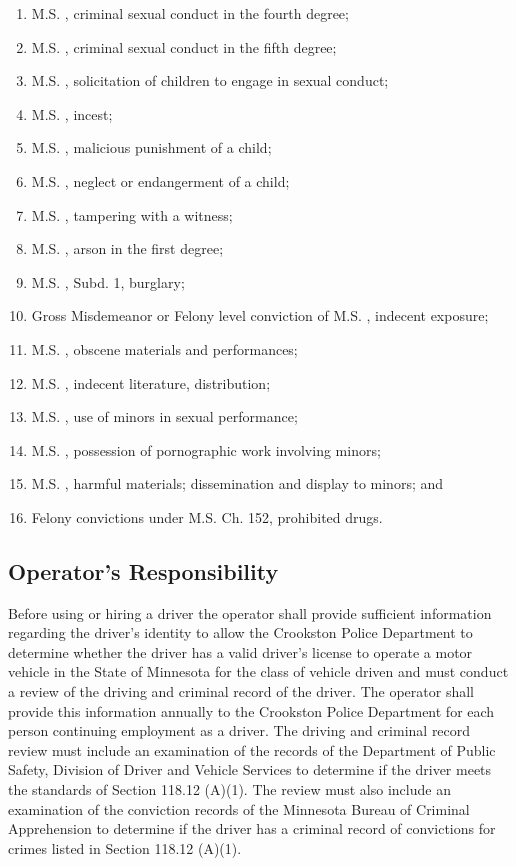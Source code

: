 \begin{enumerate}[{\indent}1)]
    \item M.S. , criminal sexual conduct in the fourth degree;
    \item M.S. , criminal sexual conduct in the fifth degree;
    \item M.S. , solicitation of children to engage in sexual conduct;
    \item M.S. , incest;
    \item M.S. , malicious punishment of a child;
    \item M.S. , neglect or endangerment of a child;
    \item M.S. , tampering with a witness;
    \item M.S. , arson in the first degree;
    \item M.S. , Subd. 1, burglary;
    \item Gross Misdemeanor or Felony level conviction of M.S. , indecent exposure;
    \item M.S. , obscene materials and performances;
    \item M.S. , indecent literature, distribution;
    \item M.S. , use of minors in sexual performance;
    \item M.S. , possession of pornographic work involving minors;
    \item M.S. , harmful materials; dissemination and display to minors; and
    \item Felony convictions under M.S. Ch. 152, prohibited drugs.
\end{enumerate}
\subsection{Operator’s Responsibility}
Before using or hiring a driver the operator shall provide sufficient information regarding the driver’s identity to allow the Crookston Police Department to determine whether the driver has a valid driver’s license to operate a motor vehicle in the State of Minnesota for the class of vehicle driven and must conduct a review of the driving and criminal record of the driver.  The operator shall provide this information annually to the Crookston Police Department for each person continuing employment as a driver.  The driving and criminal record review must include an examination of the records of the Department of Public Safety, Division of Driver and Vehicle Services to determine if the driver meets the standards of Section 118.12 (A)(1).  The review must also include an examination of the conviction records of the Minnesota Bureau of Criminal Apprehension to determine if the driver has a criminal record of convictions for crimes listed in Section 118.12 (A)(1).
